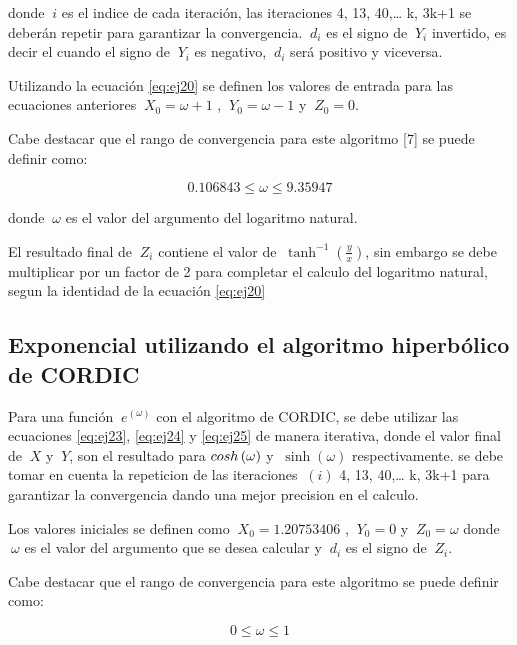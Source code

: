 donde $\ i $ es el indice de cada iteración, las iteraciones 4, 13, 40,… k, 3k+1 se deberán repetir para garantizar la convergencia. $\ d_i $ es el signo de $\ Y_i $ invertido, es decir el cuando el signo de $\ Y_i $ es negativo, $\ d_i $ será positivo y viceversa.

Utilizando la ecuación \ref{eq:ej20} se definen los valores de entrada para las ecuaciones anteriores  $\ X_0 = \omega + 1$ , $\ Y_0 = \omega - 1$ y $\ Z_0 = 0 $.

Cabe destacar que el rango de convergencia para este algoritmo [7] se puede definir como: 

\begin{equation} \label{eq:ej26}
   0.106843 \leq \omega \leq 9.35947
\end{equation}

donde $\ \omega $ es el valor del argumento del logaritmo natural.

El resultado final de $\ Z_i $ contiene el valor de $\ \tanh^{-1} \left( \frac{y}{x} \right)$, sin embargo se debe multiplicar por un factor de 2 para completar el calculo del logaritmo natural, segun la identidad de la ecuación \ref{eq:ej20} 

\subsection{Exponencial utilizando el algoritmo hiperbólico de CORDIC }


Para una función  $\ e^{\left(\omega\right)} $  con el algoritmo de CORDIC, se debe utilizar las ecuaciones \ref{eq:ej23}, \ref{eq:ej24} y \ref{eq:ej25} de manera iterativa, donde el valor final de $\ X $ y $\ Y$, son el resultado para  $\\cosh\left(\omega\right)$ y $\ \sinh\left(\omega\right)$ respectivamente. se debe tomar en cuenta la repeticion de las iteraciones $\ \left(i\right) $ 4, 13, 40,… k, 3k+1 para garantizar la convergencia dando una mejor precision en el calculo.

Los valores iniciales se definen como  $\ X_0 = 1.20753406 $ , $\ Y_0 = 0$ y $\ Z_0 = \omega $ donde $\ \omega$  es el valor del argumento que se desea calcular y $\ d_i $ es el signo de $\ Z_i $.

Cabe destacar que el rango de convergencia para este algoritmo se puede definir como: 

\begin{equation} \label{eq:ej26}
   0 \leq \omega \leq 1
\end{equation}

